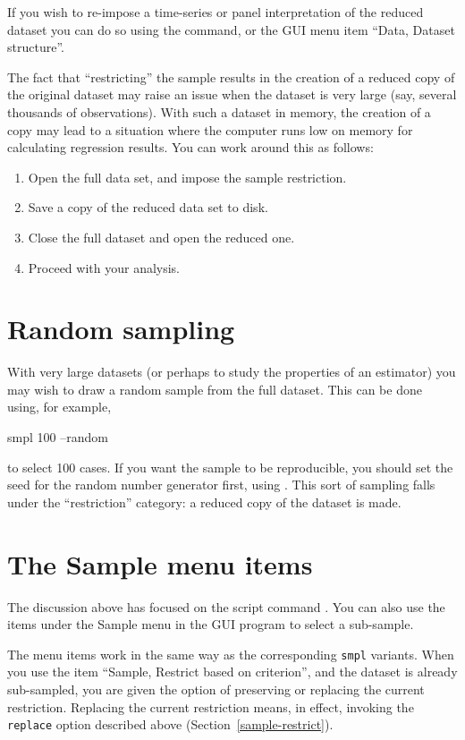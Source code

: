 If you wish to re-impose a time-series or panel interpretation of the
reduced dataset you can do so using the  command, or the
GUI menu item ``Data, Dataset structure''.

The fact that ``restricting'' the sample results in the creation of a
reduced copy of the original dataset may raise an issue when the
dataset is very large (say, several thousands of observations).  With
such a dataset in memory, the creation of a copy may lead to a
situation where the computer runs low on memory for calculating
regression results.  You can work around this as follows:

\begin{enumerate}
\item Open the full data set, and impose the sample restriction.
\item Save a copy of the reduced data set to disk.
\item Close the full dataset and open the reduced one.
\item Proceed with your analysis.
\end{enumerate}

\section{Random sampling}
\label{sample-random}

With very large datasets (or perhaps to study the properties of an
estimator) you may wish to draw a random sample from the full dataset.
This can be done using, for example,
%
\begin{code}
smpl 100 --random
\end{code}
%
to select 100 cases.  If you want the sample to be reproducible, you
should set the seed for the random number generator first, using
.  This sort of sampling falls under the ``restriction''
category: a reduced copy of the dataset is made.

\section{The Sample menu items}
\label{sample-menu}

The discussion above has focused on the script command . You
can also use the items under the \textsf{Sample} menu in the GUI
program to select a sub-sample.

The menu items work in the same way as the corresponding \verb+smpl+
variants.  When you use the item ``Sample, Restrict based on
criterion'', and the dataset is already sub-sampled, you are given the
option of preserving or replacing the current restriction.  Replacing
the current restriction means, in effect, invoking the \verb+replace+
option described above (Section~\ref{sample-restrict}).
    

